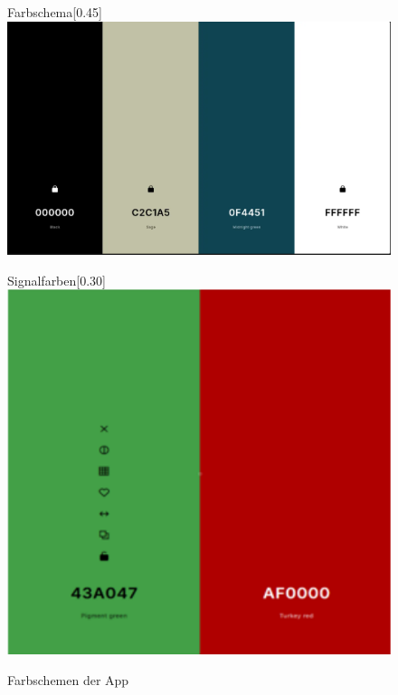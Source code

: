 \documentclass[12pt,a4paper]{article}
\begin{document}
\begin{figure}[h]
    \centering
    \begin{subcaptionbox}{Farbschema\label{fig:bild1}}[0.45\linewidth]
        {\includegraphics[width=\linewidth]{Farbschema.png}}
    \end{subcaptionbox}
    \hfill
    \begin{subcaptionbox}{Signalfarben\label{fig:bild2}}[0.30\linewidth]
        {\includegraphics[width=\linewidth]{Signalfarben.png}}
    \end{subcaptionbox}
    \caption{Farbschemen der App}
    \label{fig:nebeneinander}
\end{figure}
\end{document}
